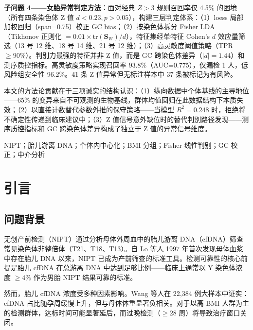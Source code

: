 \documentclass{mcm-paper}
\begin{document}
\textbf{子问题 4——女胎异常判定方法}：面对经典 $Z>3$ 规则召回率仅 4.5\% 的困境（所有四条染色体 Z 值 $d<0.23, p>0.05$），构建三层判定体系：（1）loess 局部加权回归（span=0.75）校正 GC bias；（2）按染色体拆分 Fisher LDA（Tikhonov 正则化 $=0.01\times\mathrm{tr}(\mathbf{S}_W)/d$），特征集经单特征 Cohen's $d$ 效应量筛选（13 号 12 维、18 号 14 维、21 号 12 维）；（3）高灵敏度阈值策略（TPR$\geq 90\%$）。判别力最强的特征并非 Z 值，而是 GC 跨染色体差异（$|d|=1.44$）和测序质控指标。高灵敏度策略实现召回率 93.8\%（AUC=0.775），仅漏检 1 人，低风险组安全性 96.2\%。41 条 Z 值异常但无标注样本中 37 条被标记为有风险。

本文的方法论贡献在于三项诚实的结构认识：（1）纵向数据中个体基线的主导地位——65\% 的变异来自不可观测的生物基线，群体均值回归在此数据结构下本质失效；（2）以直接计数替代参数外推的保守策略——当模型 $R^2=0.248$ 时，拒绝将不确定性传递到临床建议中；（3）Z 值信号意外缺位时的替代判别路径发现——测序质控指标和 GC 跨染色体差异构成了独立于 Z 值的异常信号维度。

\vspace{1em}
NIPT；胎儿游离 DNA；个体内中心化；BMI 分组；Fisher 线性判别；GC 校正；中介分析

\newpage

\tableofcontents
\newpage

\section{引言}

\subsection{问题背景}

无创产前检测（NIPT）通过分析母体外周血中的胎儿游离 DNA（cfDNA）筛查常见染色体非整倍体（T21、T18、T13）。自 Lo 等人 1997 年首次发现母体血浆中存在胎儿 DNA 以来\cite{lo1997}，NIPT 已成为产前筛查的标准工具。检测可靠性的核心前提是胎儿 cfDNA 在总游离 DNA 中达到足够比例——临床上通常以 Y 染色体浓度 $\geq 4\%$ 作为男胎 NIPT 结果可靠的标准。

然而，胎儿 cfDNA 浓度受多种因素影响。Wang 等人在 22,384 例大样本中证实\cite{wang2013}：cfDNA 占比随孕周缓慢上升，但与母体体重显著负相关。对于以高 BMI 人群为主的检测群体，达标时间可能显著延后，而过晚检测（$\geq 28$ 周）将导致治疗窗口关闭。
\end{document}
